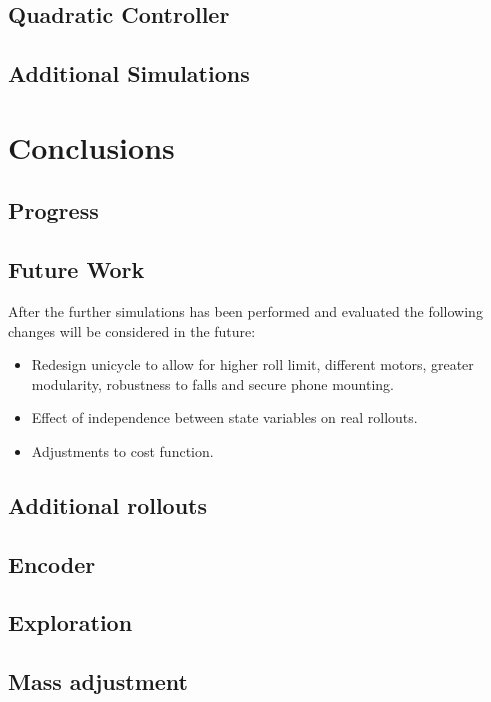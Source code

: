 \documentclass[twoside,twocolumn,12pt]{article}
\begin{document}
\subsection{Quadratic Controller}

\subsection{Additional Simulations}

\clearpage
\section{Conclusions}
\subsection{Progress}

\subsection{Future Work}
After the further simulations has been performed and evaluated the following changes will be considered in the future:

\begin{itemize}
\item Redesign unicycle to allow for higher roll limit, different motors, greater modularity, robustness to falls and secure phone mounting.
\item Effect of independence between state variables on real rollouts.
\item Adjustments to cost function.
\end{itemize}


\subsection{Additional rollouts}


\subsection{Encoder}


\subsection{Exploration}


\subsection{Mass adjustment}
\end{document}
